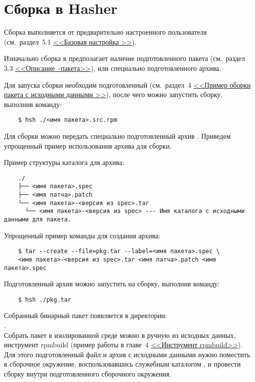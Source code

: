 \section{Сборка в Hasher}
Сборка выполняется от предварительно настроенного пользователя
(см.~раздел~5.1 \hyperlink{5.1}{<<Базовая настройка >>}).

Изначально сборка в  предполагает наличие подготовленного  пакета
(см.~раздел 3.3 \hyperlink{rpm-pack-desc}{\mbox{<<Описание -пакета>>}}),
или специально подготовленного  архива.

Для запуска сборки необходим подготовленный  (см.~раздел~4
\hyperlink{rpmbuild-exampl-src}{<<Пример оборки пакета с исходными данными >>}),
после чего можно запустить сборку, выполнив команду:

\begin{verbatim}
	$ hsh ./<имя пакета>.src.rpm
\end{verbatim}

Для сборки можно передать специально подготовленный архив . Приведем упрощенный пример
использования архива для сборки.

Пример структуры каталога для архива:
\begin{verbatim}
	./
	├── <имя пакета>.spec
	├── <имя патча>.patch
	└── <имя пакета>-<версия из spec>.tar
	  └── <имя пакета>-<версия из spec> --- Имя каталога с исходными данными для пакета.
\end{verbatim}

Упрощенный пример команды для создания  архива:
\begin{verbatim}
	$ tar --create --file=pkg.tar --label=<имя пакета>.spec \
	<имя пакета>-<версия из spec>.tar <имя патча>.patch <имя пакета>.spec
\end{verbatim}

Подготовленный архив можно запустить на сборку, выполнив команду:
\begin{verbatim}
	$ hsh ./pkg.tar
\end{verbatim}

Собранный бинарный пакет появляется в директории:\\ .\\

Собрать пакет в изолированной среде можно в ручную из исходных данных, инструмент rpmbuild (пример работы
в главе~4  \hyperlink{rpmbuild}{<<Инструмент rpmbuild>>}). Для этого подготовленный файл \Sys{.spec} и архив
с исходными данными нужно поместить в сборочное окружение, воспользовавшись служебным каталогом
\Sys{$\sim$/hasher/chroot/.in}, и провести сборку \Sys{rpmbuild} внутри подготовленного сборочного окружения.

